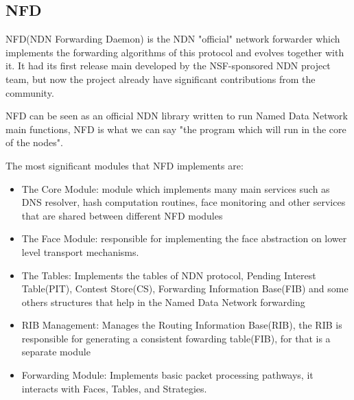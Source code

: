 \documentclass[preprint,12pt]{elsarticle}
\begin{document}
\subsection{NFD}
NFD(NDN Forwarding Daemon) is the NDN "official" network forwarder which implements the forwarding algorithms of this protocol and evolves together with it. It had its first release main developed by the NSF-sponsored NDN project team, but now the project already have significant contributions from the community.\par
NFD can be seen as an official NDN library written to run Named Data Network main functions, NFD is what we can say "the program which will run in the core of the nodes".\par
The most significant modules that NFD implements are:

	\begin{itemize}


         \item The Core Module: module which implements many main services such as DNS resolver, hash computation routines, face monitoring and other services that are shared between different NFD modules
        
        \item The Face Module: responsible for implementing the face abstraction on lower level transport mechanisms. 
        
        \item The Tables: Implements the tables of NDN protocol, Pending Interest Table(PIT), Contest Store(CS), Forwarding Information Base(FIB) and some others structures that help in the Named Data Network forwarding
        
        \item RIB Management: Manages the Routing Information Base(RIB), the RIB is responsible for generating a consistent fowarding table(FIB), for that is a separate module

        \item Forwarding Module: Implements basic packet processing pathways, it interacts with Faces, Tables, and Strategies.
	\end{itemize}
\end{document}
